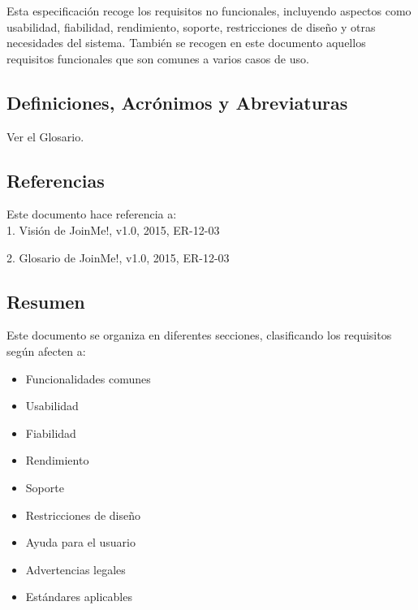 \documentclass[12pt, a4paper, titlepage]{article}
\begin{document}
Esta especificación recoge los requisitos no funcionales, incluyendo aspectos como usabilidad, fiabilidad, rendimiento, soporte, restricciones de diseño y otras necesidades del sistema. También se recogen en este documento aquellos requisitos funcionales que son comunes a varios casos de uso.

\subsection{Definiciones, Acrónimos y Abreviaturas}

Ver el Glosario.

\subsection{Referencias}

Este documento hace referencia a:\\

1. Visión de JoinMe!, v1.0, 2015, ER-12-03

2. Glosario de JoinMe!, v1.0, 2015, ER-12-03

\subsection{Resumen}

Este documento se organiza en diferentes secciones, clasificando los requisitos según afecten a:

\begin{itemize}
	\item Funcionalidades comunes
	\item Usabilidad
	\item Fiabilidad
	\item Rendimiento
	\item Soporte
	\item Restricciones de diseño
	\item Ayuda para el usuario
	\item Advertencias legales
	\item Estándares aplicables
\end{itemize}
\end{document}
